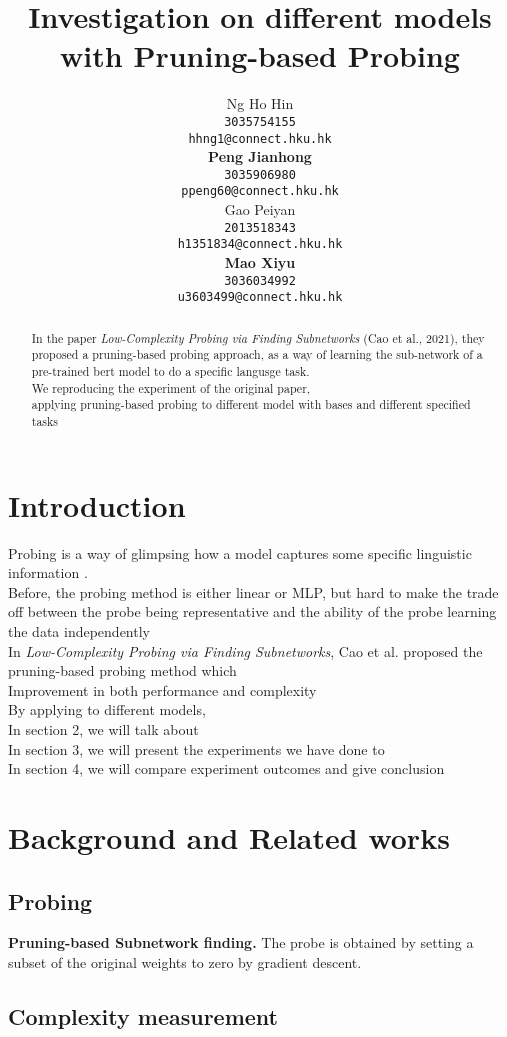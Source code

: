 \documentclass[11pt]{article}
\title{Investigation on different models with Pruning-based Probing}
\author{Ng Ho Hin \\
        {\tt 3035754155} \\
        {\tt hhng1@connect.hku.hk} \\
        {\bf Peng Jianhong} \\
        {\tt 3035906980} \\
        {\tt ppeng60@connect.hku.hk} \\\And
        Gao Peiyan \\
        {\tt 2013518343} \\
        {\tt h1351834@connect.hku.hk} \\
        {\bf Mao Xiyu} \\
        {\tt 3036034992} \\
        {\tt u3603499@connect.hku.hk}}
\date{}
\begin{document}
\maketitle
\begin{abstract}
  In the paper {\em Low-Complexity Probing via Finding Subnetworks} (Cao et al., 2021), they proposed a pruning-based probing approach, as a way of learning the sub-network of a pre-trained bert model to do a specific langusge task. \\ We reproducing the experiment of the original paper, \\ applying pruning-based probing to different model with bases and different specified tasks
  
\end{abstract}

\section{Introduction}
Probing is a way of glimpsing how a model captures some specific linguistic information \cite{Tenney}.\\
Before, the probing method is either linear or MLP, but hard to make the trade off between the probe being representative and the ability of the probe learning the data independently  \\
In {\em Low-Complexity Probing via Finding Subnetworks}, Cao et al. proposed the pruning-based probing method which\\
Improvement in both performance and complexity \\
By applying to different models, \\
In section 2, we will talk about \\
In section 3, we will present the experiments we have done to \\
In section 4, we will compare experiment outcomes and give conclusion \\
\section{Background and Related works}
\subsection{Probing}
{\bf Pruning-based Subnetwork finding.} The probe is obtained by setting a subset of the original weights to zero by gradient descent.
\subsection{Complexity measurement}
\end{document}
